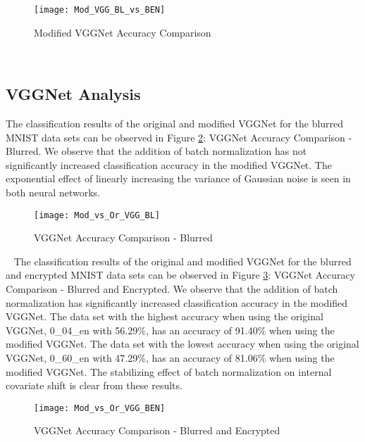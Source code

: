 \documentclass[12pt, titlepage]{article}
\begin{document}
\begin{figure}[h!]
	\begin{center}
		\texttt{[image: Mod\_VGG\_BL\_vs\_BEN]}
		\caption{Modified VGGNet Accuracy Comparison}
		\label{GRAPH_ModifiedVGG}
	\end{center}
\end{figure} 

~\newpage
\subsection{VGGNet Analysis}\label{VGGAnalysis}

The classification results of the original and modified VGGNet for the blurred MNIST data sets can be observed in Figure \ref{GRAPH_COMP_VGG_BL}: VGGNet Accuracy Comparison - Blurred. We observe that the addition of batch normalization has not significantly increased classification accuracy in the modified VGGNet. The exponential effect of linearly increasing the variance of Gaussian noise is seen in both neural networks.\\

\begin{figure}[h!]
	\begin{center}
		\texttt{[image: Mod\_vs\_Or\_VGG\_BL]}
		\caption{VGGNet Accuracy Comparison - Blurred}
		\label{GRAPH_COMP_VGG_BL}
	\end{center}
\end{figure}

~\newpage
\noindent The classification results of the original and modified VGGNet for the blurred and encrypted MNIST data sets can be observed in Figure \ref{GRAPH_COMP_VGG_BEN}: VGGNet Accuracy Comparison - Blurred and Encrypted. We observe that the addition of batch normalization has significantly increased classification accuracy in the modified VGGNet. The data set with the highest accuracy when using the original VGGNet, 0\_04\_en with 56.29\%, has an accuracy of 91.40\% when using the modified VGGNet. The data set with the lowest accuracy when using the original VGGNet, 0\_60\_en with 47.29\%, has an accuracy of 81.06\% when using the modified VGGNet. The stabilizing effect of batch normalization on internal covariate shift is clear from these results.\\

\begin{figure}[h!]
	\begin{center}
		\texttt{[image: Mod\_vs\_Or\_VGG\_BEN]}
		\caption{VGGNet Accuracy Comparison - Blurred and Encrypted}
		\label{GRAPH_COMP_VGG_BEN}
	\end{center}
\end{figure}
\end{document}
